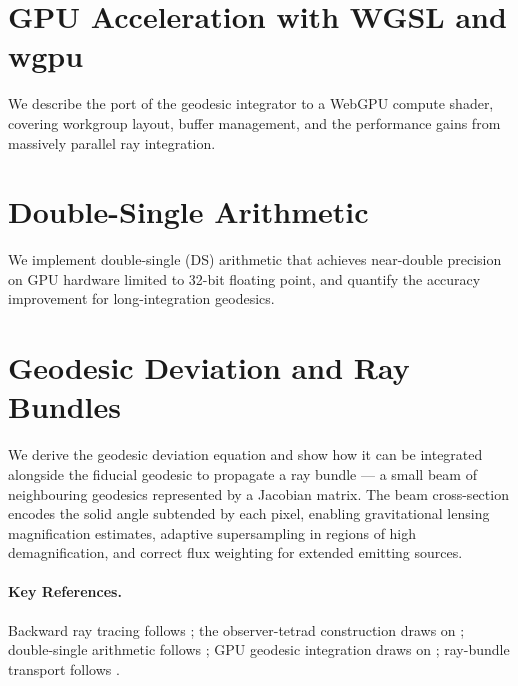 \section{GPU Acceleration with WGSL and wgpu}
\label{sec:rt-gpu}

We describe the port of the geodesic integrator to a WebGPU compute shader,
covering workgroup layout, buffer management, and the performance gains
from massively parallel ray integration.

\section{Double-Single Arithmetic}
\label{sec:rt-double-single}

We implement double-single (DS) arithmetic that achieves near-double precision
on GPU hardware limited to 32-bit floating point, and quantify the accuracy
improvement for long-integration geodesics.

\section{Geodesic Deviation and Ray Bundles\starmark{}}
\label{sec:rt-deviation}

We derive the geodesic deviation equation and show how it can be integrated
alongside the fiducial geodesic to propagate a ray bundle --- a small beam of
neighbouring geodesics represented by a Jacobian matrix. The beam
cross-section encodes the solid angle subtended by each pixel, enabling
gravitational lensing magnification estimates, adaptive supersampling in
regions of high demagnification, and correct flux weighting for extended
emitting sources.

\paragraph{Key References.}
Backward ray tracing follows \cite{James2015,Chan2013}; the observer-tetrad
construction draws on \cite{MTW1973}; double-single arithmetic follows
\cite{Thall2006}; GPU geodesic integration draws on \cite{Verbraeck2021};
ray-bundle transport follows \cite{Pretorius2009}.
